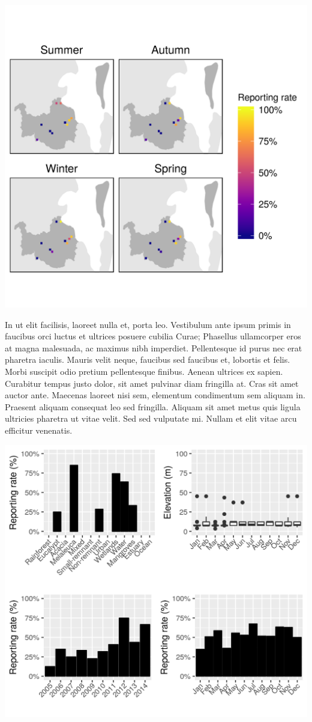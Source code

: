 \documentclass[12pt,openany,oneside]{book}
\theoremstyle{definition}
\theoremstyle{definition}
\theoremstyle{definition}
\theoremstyle{remark}
\begin{document}
\includegraphics{assets/maps/Dendrocygna-arcuata.png}

In ut elit facilisis, laoreet nulla et, porta leo. Vestibulum ante ipsum
primis in faucibus orci luctus et ultrices posuere cubilia Curae;
Phasellus ullamcorper eros at magna malesuada, ac maximus nibh
imperdiet. Pellentesque id purus nec erat pharetra iaculis. Mauris velit
neque, faucibus sed faucibus et, lobortis et felis. Morbi suscipit odio
pretium pellentesque finibus. Aenean ultrices ex sapien. Curabitur
tempus justo dolor, sit amet pulvinar diam fringilla at. Cras sit amet
auctor ante. Maecenas laoreet nisi sem, elementum condimentum sem
aliquam in. Praesent aliquam consequat leo sed fringilla. Aliquam sit
amet metus quis ligula ultricies pharetra ut vitae velit. Sed sed
vulputate mi. Nullam et elit vitae arcu efficitur venenatis.

\includegraphics{assets/graphs/Dendrocygna-arcuata.png}
\end{document}
